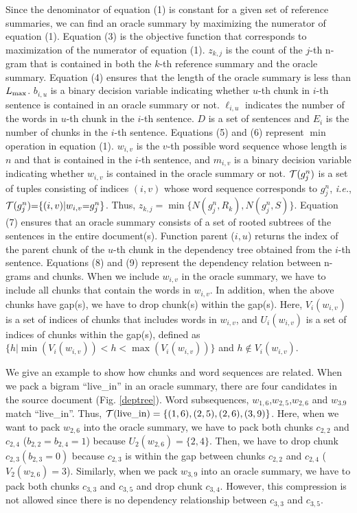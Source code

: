 \documentclass[11pt,a4paper]{article}
\begin{document}
\noindent
Since the denominator of equation (1) is constant
for a given set of reference summaries, we
can find an oracle summary by maximizing the numerator
of equation (1).
Equation (3) is the objective function that corresponds to maximization of
the numerator of equation (1). 
$z_{k,j}$ is the count of the $j$-th n-gram that is contained in both 
the $k$-th reference summary and the oracle summary.
Equation (4) ensures that the length of the oracle summary is less than
$L_{\rm max}$.
$b_{i,u}$ is a binary decision variable indicating whether $u$-th chunk in $i$-th
sentence is contained in an oracle summary or not. $\ell_{i,u}$ indicates the number
of the words in $u$-th chunk in the $i$-th sentence.
$D$ is a set of sentences and $E_i$ is the number of chunks in the $i$-th sentence.
Equations (5) and (6) represent $\min$ operation in equation (1).
$w_{i,v}$
 is the $v$-th possible word sequence whose length is $n$ and that is contained in the $i$-th sentence, and $m_{i,v}$ is a binary decision variable indicating whether
$w_{i,v}$ 
is contained in the oracle summary or not.
${\cal T}(g_j^n)$ is a set of tuples consisting of indices $(i,v)$ whose
word sequence
corresponds to $g_j^n$, {\it i.e.},
${\cal T}(g_j^n){=}\{(i,v)|w_{i,v}{=}g_j^n\}$.
Thus, $z_{k,j}{=}\min\{N(g_j^n,R_k),N(g_j^n,S)\}$.
Equation (7) ensures that an oracle summary consists of a set of
rooted subtrees of the sentences in the entire document(s).
Function parent ($i,u$) returns the index of the parent chunk of the $u$-th
chunk in the dependency tree obtained from the $i$-th sentence.
Equations (8) and (9) represent the dependency relation between n-grams and
chunks.
When we 
include $w_{i,v}$ in the oracle summary,
we have to include all chunks that contain the words in $w_{i,v}$.
In addition, when the above chunks have gap(s), we have to drop chunk(s) within
the gap(s).
Here, $V_i(w_{i,v})$ is a set of indices of
chunks that includes words in $w_{i,v}$, and $U_i(w_{i,v})$ is a set of
indices of chunks within the gap(s), defined as 
 $\{h| \min(V_i(w_{i,v}))<h< \max(V_i(w_{i,v}))\}$ and 
 $h \notin
 V_i(w_{i,v})$.

We give an example to show how chunks and word sequences are related.
When we pack a bigram ``live\_in'' in an oracle summary, there are
four candidates in the source document (Fig. \ref{deptree}).
Word subsequences, $w_{1,6}$,$w_{2,5}$,$w_{2,6}$ and $w_{3.9}$ match ``live\_in''.
Thus, 
 ${\cal T}(\text{live\_in})=\{(1,6),(2,5),(2,6),(3,9)\}$.
Here, when we want to pack $w_{2,6}$ into the oracle summary,
we have to pack both chunks $c_{2,2}$ and $c_{2,4}$ ($b_{2,2}=b_{2,4}=1$) because
$U_2(w_{2,6})=\{2,4\}$. Then, we have to drop chunk $c_{2,3} (b_{2,3}=0)$ because 
$c_{2,3}$ is within the gap between chunks $c_{2,2}$ and $c_{2,4}$ ($V_2(w_{2,6})=3$).
Similarly, when we pack $w_{3,9}$ into an oracle summary, we have to
pack both chunks $c_{3,3}$ and $c_{3,5}$ and drop chunk $c_{3,4}$.
However, this compression is not allowed since 
 there is no dependency relationship between $c_{3,3}$ and $c_{3,5}$.
\end{document}
